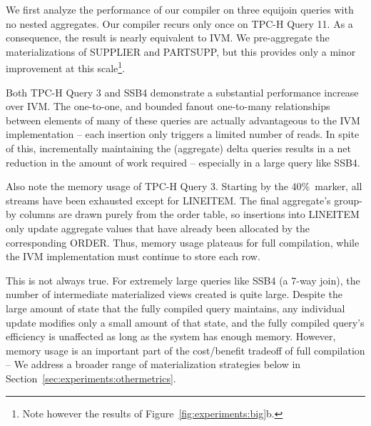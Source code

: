 We first analyze the performance of our compiler on three equijoin queries with no nested aggregates.  Our compiler recurs only once on TPC-H Query 11.  As a consequence, the result is nearly equivalent to IVM.  We pre-aggregate the materializations of SUPPLIER and PARTSUPP, but this provides only a minor improvement at this scale\footnote{Note however the results of Figure~\ref{fig:experiments:big}b.}.  

Both TPC-H Query 3 and SSB4 demonstrate a substantial performance increase over IVM.  The one-to-one, and bounded fanout one-to-many relationships between elements of many of these queries are actually advantageous to the IVM implementation -- each insertion only triggers a limited number of reads.  In spite of this, incrementally maintaining the (aggregate) delta queries results in a net reduction in the amount of work required -- especially in a large query like SSB4.

Also note the memory usage of TPC-H Query 3.  Starting by the 40\%\ marker, all streams have been exhausted except for LINEITEM.  The final aggregate's group-by columns are drawn purely from the order table, so insertions into LINEITEM only update aggregate values that have already been allocated by the corresponding ORDER.  Thus, memory usage plateaus for full compilation, while the IVM implementation must continue to store each row.

This is not always true.  For extremely large queries like SSB4 (a 7-way join), the number of intermediate materialized views created is quite large.  Despite the large amount of state that the fully compiled query maintains, any individual update modifies only a small amount of that state, and the fully compiled query's efficiency is unaffected as long as the system has enough memory.  However, memory usage is an important part of the cost/benefit tradeoff of full compilation -- We address a broader range of materialization strategies below in Section~\ref{sec:experiments:othermetrics}.



